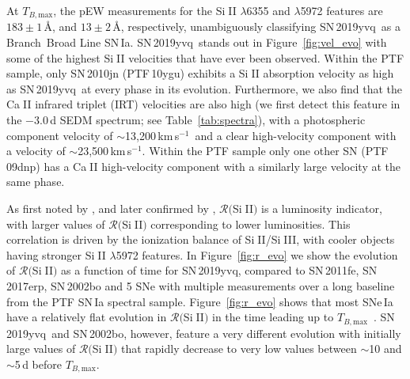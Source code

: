 \documentclass[twocolumn]{aastex63}
\def\ion#1#2{#1$\;${\footnotesize\rm{#2}}\relax}
\newcommand{\tbmax}{$T_{B,\mathrm{max}}$}
\newcommand{\kms}{km\,s$^{-1}$}
\newcommand{\sn}{SN\,2019yvq}
\begin{document}
At \tbmax, the pEW measurements for the \ion{Si}{II} $\lambda$6355 and
$\lambda$5972 features are $183\pm1$\,\AA, and $13\pm2$\,\AA, respectively,
unambiguously classifying \sn\ as a Branch~Broad Line SN\,Ia.
\sn\ stands out in Figure~\ref{fig:vel_evo} with some of the highest
\ion{Si}{II} velocities that have ever been observed. Within the PTF sample,
only SN\,2010jn (PTF\,10ygu) exhibits a \ion{Si}{II} absorption velocity as
high as \sn\ at every phase in its evolution. Furthermore, we also find that
the \ion{Ca}{II} infrared triplet (IRT) velocities are also high (we first
detect this feature in the $-3.0$\,d SEDM spectrum; see
Table~\ref{tab:spectra}), with a photospheric component velocity of
$\sim$13,200\,\kms\ and a clear high-velocity component with a velocity of
$\sim$23,500\,\kms. Within the PTF sample only one other SN (PTF\,09dnp) has a
\ion{Ca}{II} high-velocity component with a similarly large velocity at the
same phase.

As first noted by \citet{Nugent95}, and later confirmed by
\citet{Hachinger08}, $\mathcal{R}($\ion{Si}{II}$)$ is a luminosity indicator,
with larger values of $\mathcal{R}($\ion{Si}{II}$)$ corresponding to lower
luminosities. This correlation is driven by the ionization balance of
\ion{Si}{II}/\ion{Si}{III}, with cooler objects having stronger \ion{Si}{II}
$\lambda$5972 features. In Figure~\ref{fig:r_evo} we show the evolution of
$\mathcal{R}($\ion{Si}{II}$)$ as a function of time for \sn, compared to
SN\,2011fe, SN\,2017erp, SN\,2002bo and 5 SNe with multiple measurements over
a long baseline from the PTF SN\,Ia spectral sample. Figure~\ref{fig:r_evo}
shows that most SNe\,Ia have a relatively flat evolution in
$\mathcal{R}($\ion{Si}{II}$)$ in the time leading up to \tbmax\ \citep[see
also][]{Riess98a}. \sn\ and SN\,2002bo, however, feature a very different
evolution with initially large values of $\mathcal{R}($\ion{Si}{II}$)$ that
rapidly decrease to very low values between $\sim$10 and $\sim$5\,d before
\tbmax.
\end{document}
